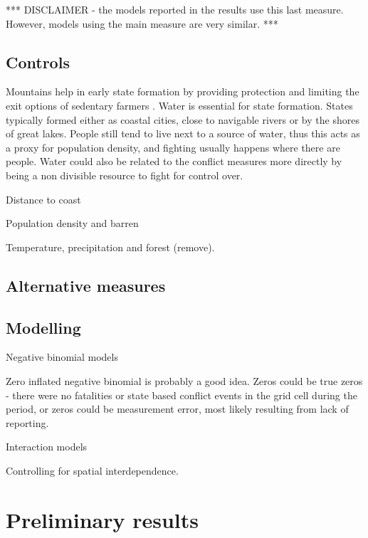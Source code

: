 \documentclass[12pt]{article}
\begin{document}
*** DISCLAIMER - the models reported in the results use this last measure.
However, models using the main measure are very similar. *** 

\subsection{Controls}

Mountains help in early state formation by providing protection and limiting the
exit options of sedentary farmers \citep{Carneiro1988}. Water is essential for
state formation.  States typically formed either as coastal cities, close to
navigable rivers or by the shores of great lakes. People still tend to live next
to a source of water, thus this acts as a proxy for population density, and
fighting usually happens where there are people. Water could also be related to
the conflict measures more directly by being a non divisible resource to fight
for control over.

Distance to coast

Population density and barren

Temperature, precipitation and forest (remove).

\subsection{Alternative measures}

\subsection{Modelling}

Negative binomial models

Zero inflated negative binomial is probably a good idea. Zeros could be true
zeros - there were no fatalities or state based conflict events in the grid cell
during the period, or zeros could be measurement error, most likely resulting
from lack of reporting.

Interaction models

Controlling for spatial interdependence.

\section{Preliminary results}
\end{document}
